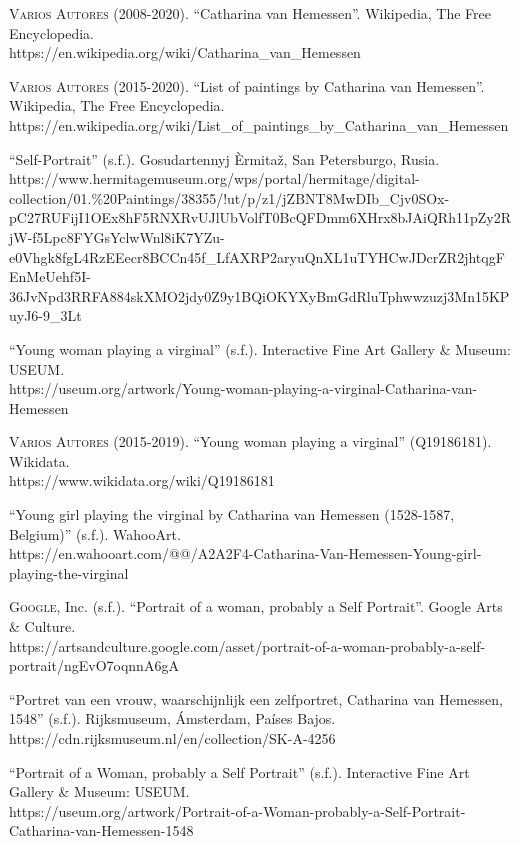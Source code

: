 \documentclass[12pt]{book}
\begin{document}
\textsc{Varios Autores} (2008-2020). ``Catharina van Hemessen''. Wikipedia, The Free Encyclopedia.\\
https://en.wikipedia.org/wiki/Catharina_van_Hemessen\bigskip

\textsc{Varios Autores} (2015-2020). ``List of paintings by Catharina van Hemessen''. Wikipedia, The Free Encyclopedia.\\
https://en.wikipedia.org/wiki/List_of_paintings_by_Catharina_van_Hemessen\bigskip

``Self-Portrait'' (s.f.). Gosudartennyj Èrmitaž, San Petersburgo, Rusia.\\
https://www.hermitagemuseum.org/wps/portal/hermitage/digital-collection/01.\%20Paintings/38355/!ut/p/z1/jZBNT8MwDIb_Cjv0SOx-pC27RUFijI1OEx8hF5RNXRvUJlUbVolfT0BcQFDmm6XHrx8bJAiQRh11pZy2RjW-f5Lpc8FYGsYclwWnl8iK7YZu-e0Vhgk8fgL4RzEEecr8BCCn45f_LfAXRP2aryuQnXL1uTYHCwJDcrZR2jhtqgFEnMeUehf5I-36JvNpd3RRFA884skXMO2jdy0Z9y1BQiOKYXyBmGdRluTphwwzuzj3Mn15KPuyJ6-9_3Lt\bigskip

``Young woman playing a virginal'' (s.f.). Interactive Fine Art Gallery \& Museum: USEUM.\\
https://useum.org/artwork/Young-woman-playing-a-virginal-Catharina-van-Hemessen\bigskip

\textsc{Varios Autores} (2015-2019). ``Young woman playing a virginal'' (Q19186181). Wikidata.\\
https://www.wikidata.org/wiki/Q19186181\bigskip

``Young girl playing the virginal by Catharina van Hemessen (1528-1587, Belgium)'' (s.f.). WahooArt.\\
https://en.wahooart.com/@@/A2A2F4-Catharina-Van-Hemessen-Young-girl-playing-the-virginal\bigskip

\textsc{Google}, Inc. (s.f.). ``Portrait of a woman, probably a Self Portrait''. Google Arts \& Culture.\\
https://artsandculture.google.com/asset/portrait-of-a-woman-probably-a-self-portrait/ngEvO7oqnnA6gA\bigskip

``Portret van een vrouw, waarschijnlijk een zelfportret, Catharina van Hemessen, 1548'' (s.f.). Rijksmuseum, Ámsterdam, Países Bajos.\\
https://cdn.rijksmuseum.nl/en/collection/SK-A-4256\bigskip

``Portrait of a Woman, probably a Self Portrait'' (s.f.). Interactive Fine Art Gallery \& Museum: USEUM.\\
https://useum.org/artwork/Portrait-of-a-Woman-probably-a-Self-Portrait-Catharina-van-Hemessen-1548\bigskip
\end{document}
